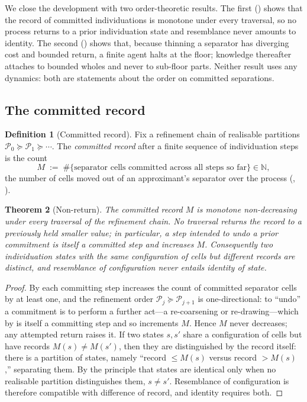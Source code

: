 \documentclass[11pt,twocolumn,a4paper]{article}
\theoremstyle{thmstyle}
\newtheorem{theorem}{Theorem}[section]
\theoremstyle{definition}
\newtheorem{definition}[theorem]{Definition}
\theoremstyle{remark}
\newcommand{\N}{\mathbb{N}}
\newcommand{\Part}{\mathscr{P}}
\begin{document}
We close the development with two order-theoretic results. The first
() shows that the record of committed individuations is
monotone under every traversal, so no process returns to a prior individuation
state and resemblance never amounts to identity. The second
() shows that, because thinning a separator has diverging
cost and bounded return, a finite agent halts at the floor; knowledge thereafter
attaches to bounded wholes and never to sub-floor parts. Neither result uses any
dynamics: both are statements about the order on committed separations.

\subsection{The committed record}

\begin{definition}[Committed record]
\label{def:record}
Fix a refinement chain of realisable partitions
$\Part_0\succeq\Part_1\succeq\cdots$. The \emph{committed record} after a finite
sequence of individuation steps is the count
\[
M\;:=\;\#\{\text{separator cells committed across all steps so far}\}\in\N,
\]
the number of cells moved out of an approximant's separator over the process
\textup{(}, \textup{)}.
\end{definition}

\begin{theorem}[Non-return]
\label{thm:nonreturn}
The committed record $M$ is monotone non-decreasing under every traversal of the
refinement chain. No traversal returns the record to a previously held smaller
value; in particular, a step intended to undo a prior commitment is itself a
committed step and increases $M$. Consequently two individuation states with the
same configuration of cells but different records are distinct, and resemblance
of configuration never entails identity of state.
\end{theorem}

\begin{proof}
By  each committing step increases the count of
committed separator cells by at least one, and the refinement order
$\Part_j\succeq\Part_{j+1}$ is one-directional: to ``undo'' a commitment is to
perform a further act---a re-coarsening or re-drawing---which by
 is itself a committing step and so increments $M$. Hence $M$
never decreases; any attempted return raises it. If two states $s,s'$ share a
configuration of cells but have records $M(s)\neq M(s')$, then they are
distinguished by the record itself: there is a partition of states, namely
``record $\le M(s)$ versus record $>M(s)$,'' separating them. By the principle
that states are identical only when no realisable partition distinguishes them,
$s\neq s'$. Resemblance of configuration is therefore compatible with difference
of record, and identity requires both.
\end{proof}
\end{document}
